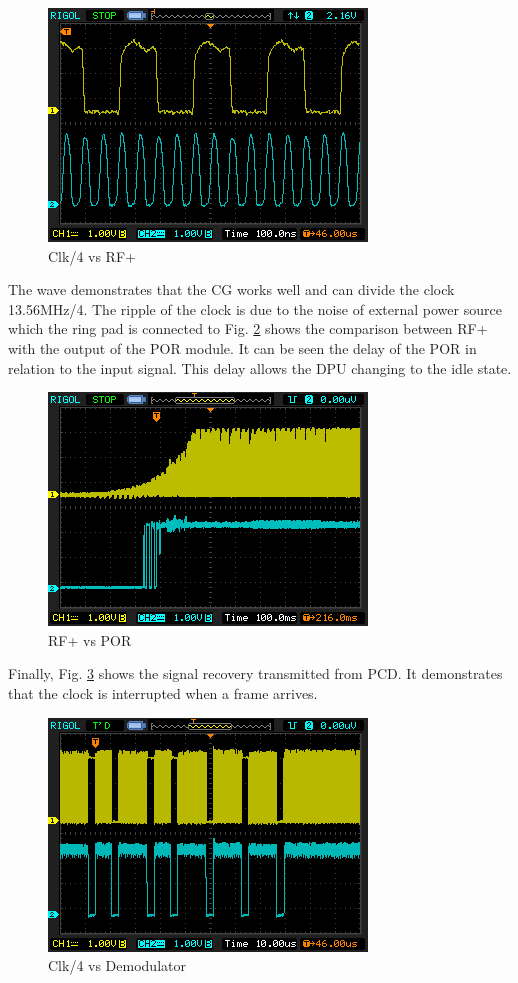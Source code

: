 \documentclass[a4paper, 10pt, conference]{ieeeconf}      %
\begin{document}
\begin{figure}[H]
    \centering
    \includegraphics[scale=0.5]{Images/ImagenesTesina/mediciones/clk.png}
    \caption{Clk/4 vs RF+}
    \label{fig:clock_medicion}
\end{figure}

The wave demonstrates that the CG works well and can divide the clock 13.56MHz/4. The ripple of the clock is due to the noise of
external power source which the ring pad is connected to
Fig. \ref{fig:por_medicion} shows the comparison between RF+ with the output of the POR module. It can be seen the delay of the
POR in relation to the input signal. This delay allows the
DPU changing to the idle state.

\begin{figure}[H]
    \centering
    \includegraphics[scale=0.5]{Images/ImagenesTesina/mediciones/por.png}
    \caption{RF+ vs POR}
    \label{fig:por_medicion}
\end{figure}


Finally, Fig. \ref{fig:demod_medicion} shows the signal recovery transmitted from
PCD. It demonstrates that the clock is interrupted when a
frame arrives.

\begin{figure}[H]
    \centering
    \includegraphics[scale=0.65]{Images/ImagenesTesina/mediciones/demod2.png}
    \caption{Clk/4 vs Demodulator}
    \label{fig:demod_medicion}
\end{figure}
\end{document}
